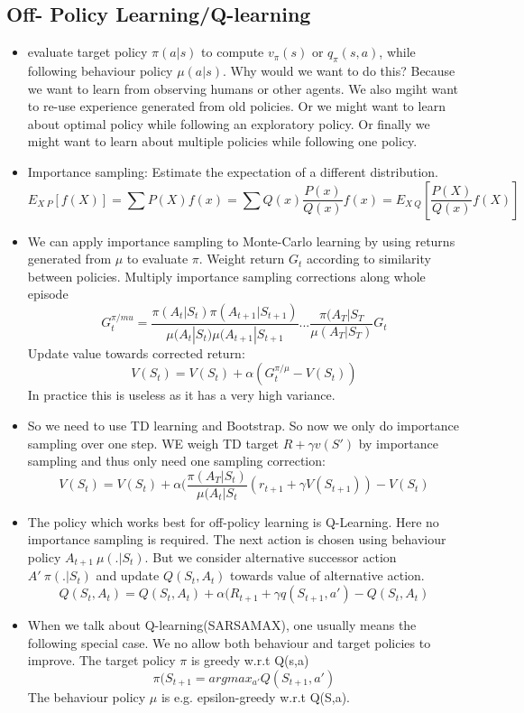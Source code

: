 \documentclass[a4paper]{article}
\begin{document}
\subsection{Off- Policy Learning/Q-learning}
\begin{itemize}
    \item evaluate target policy $\pi(a|s)$ to compute $v_{\pi}(s)$ or $q_{\pi}(s,a)$, while following behaviour policy $\mu(a|s)$. Why would we want to do this? Because we want to learn from observing humans or other agents. We also mgiht want to re-use experience generated from old policies. Or we might want to learn about optimal policy while following an exploratory policy. Or finally we might want to learn about multiple policies while following one policy. 
    \item Importance sampling: Estimate the expectation of a different distribution. $$ E_{X~P}[f(X)] = \sum P(X)f(x) = \sum Q(x) \frac{P(x)}{Q(x)} f(x) = E_{X~Q}[\frac{P(X)}{Q(x)}f(X)]$$
    \item We can apply importance sampling to Monte-Carlo learning by using returns generated from $\mu$ to evaluate $\pi$. Weight return $G_t$ according to similarity between policies. Multiply importance sampling corrections along whole episode $$G_t^{\pi/mu} =\frac{\pi(A_t|S_t)\pi(A_{t+1}|S_{t+1})}{\mu(A_t|S_t) \mu(A_{t+1}|S_{t+1}}...\frac{\pi(A_T|S_T}{\mu(A_T|S_T)}G_t$$ Update value towards corrected return: $$V(S_t) = V(S_t) + \alpha(G_t^{\pi/\mu}-V(S_t))$$
    \newline In practice this is useless as it has a very high variance. 
    \item So we need to use TD learning and Bootstrap. So now we only do importance sampling over one step. WE weigh TD target $R + \gamma v(S')$ by importance sampling and thus only need one sampling correction: $$ V(S_t) = V(S_t) + \alpha (\frac{\pi(A_T|S_t)}{\mu(A_t|S_t}(r_{t+1} + \gamma V(S_{t+1})) - V(S_t)$$
    \item The policy which works best for off-policy learning is Q-Learning. Here no importance sampling is required. The next action is chosen using behaviour policy $A_{t+1} ~ \mu(.|S_t)$. But we consider alternative successor action $A' ~ \pi(.|S_t)$ and update $Q(S_t, A_t)$ towards value of alternative action. $$Q(S_t, A_t) = Q(S_t,A_t) + \alpha(R_{t+1} + \gamma q(S_{t+1}, a') - Q(S_t, A_t)$$
    \item When we talk about Q-learning(SARSAMAX), one usually means the following special case. We no allow both behaviour and target policies to improve. The target policy $\pi$ is greedy w.r.t Q(s,a) $$\pi(S_{t+1} = argmax_{a'}Q(S_{t+1},a')$$ The behaviour policy $\mu$ is e.g. epsilon-greedy w.r.t Q(S,a). 

\end{itemize}
\end{document}
